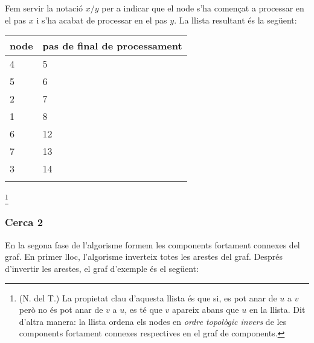 Fem servir la notació $x/y$ per a indicar que el node s'ha començat a
processar en el pas $x$ i s'ha acabat de processar en el pas
$y$. La llista resultant és la següent:


\begin{tabular}{ll}
\\
node & pas de final de processament \\
\hline
4 & 5 \\
5 & 6 \\
2 & 7 \\
1 & 8 \\
6 & 12 \\
7 & 13 \\
3 & 14 \\
\\
\end{tabular}

\footnote{(N. del T.) La propietat clau d'aquesta llista és que si, es pot anar
de $u$ a $v$ però no és pot anar de $v$ a $u$, es té que $v$ apareix
abans que $u$ en la llista. Dit d'altra manera: la llista ordena els
nodes en \emph{ordre topològic invers} de les components fortament
connexes respectives en el graf de components.}

\subsubsection{Cerca 2}

En la segona fase de l'algorisme formem les components fortament
connexes del graf. En primer lloc, l'algorisme inverteix totes les
arestes del graf. Després d'invertir les arestes, el graf d'exemple és el següent:
\begin{center}
\end{center}

